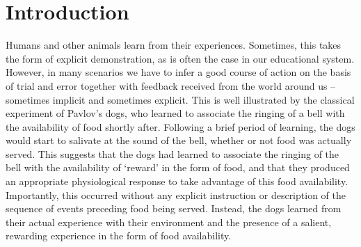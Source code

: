 \section{Introduction}
\label{sec:intro}

Humans and other animals learn from their experiences.
Sometimes, this takes the form of explicit demonstration, as is often the case in our educational system.
However, in many scenarios we have to infer a good course of action on the basis of trial and error together with feedback received from the world around us -- sometimes implicit and sometimes explicit.
This is well illustrated by the classical experiment of Pavlov's dogs, who learned to associate the ringing of a bell with the availability of food shortly after.
Following a brief period of learning, the dogs would start to salivate at the sound of the bell, whether or not food was actually served.
This suggests that the dogs had learned to associate the ringing of the bell with the availability of `reward' in the form of food, and that they produced an appropriate physiological response to take advantage of this food availability.
Importantly, this occurred without any explicit instruction or description of the sequence of events preceding food being served.
Instead, the dogs learned from their actual experience with their environment and the presence of a salient, rewarding experience in the form of food availability.

